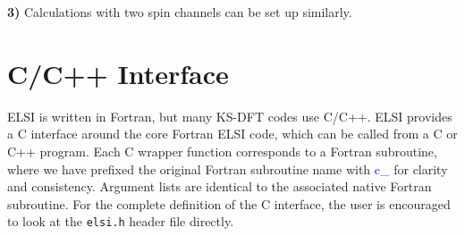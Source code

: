 \documentclass{report}
\begin{document}
\textbf{3)} Calculations with two spin channels can be set up similarly.\\

\section{C/C++ Interface}
\label{sec:c}
ELSI is written in Fortran, but many KS-DFT codes use C/C++.  ELSI provides a C interface around the core Fortran ELSI code, which can be called from a C or C++ program.  Each C wrapper function corresponds to a Fortran subroutine, where we have prefixed the original Fortran subroutine name with \textcolor{blue}{c\_} for clarity and consistency.  Argument lists are identical to the associated native Fortran subroutine.  For the complete definition of the C interface, the user is encouraged to look at the \texttt{elsi.h} header file directly.\\
\end{document}
